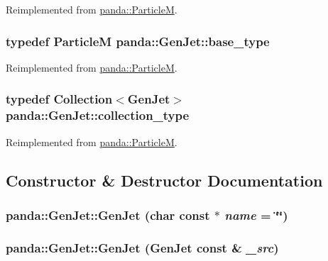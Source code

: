 Reimplemented from \hyperlink{classpanda_1_1ParticleM_a1ba36e35f5cd6a26decfbaa815678d2a}{panda::ParticleM}.\hypertarget{classpanda_1_1GenJet_acec2fc5754d9d9da9805cbdaff566ee4}{
\subsubsection[{base\_\-type}]{\setlength{\rightskip}{0pt plus 5cm}typedef {\bf ParticleM} {\bf panda::GenJet::base\_\-type}}}
\label{classpanda_1_1GenJet_acec2fc5754d9d9da9805cbdaff566ee4}


Reimplemented from \hyperlink{classpanda_1_1ParticleM_a134d640b78531bc47ddb19ba490de07d}{panda::ParticleM}.\hypertarget{classpanda_1_1GenJet_adf2446e9cb42ccd9a7b2e790d674965a}{
\subsubsection[{collection\_\-type}]{\setlength{\rightskip}{0pt plus 5cm}typedef {\bf Collection}$<${\bf GenJet}$>$ {\bf panda::GenJet::collection\_\-type}}}
\label{classpanda_1_1GenJet_adf2446e9cb42ccd9a7b2e790d674965a}


Reimplemented from \hyperlink{classpanda_1_1ParticleM_ae39fbe234c21960d067e8790541d0d68}{panda::ParticleM}.

\subsection{Constructor \& Destructor Documentation}
\hypertarget{classpanda_1_1GenJet_aca195391522e9b5e1541ba22f3dedb6e}{
\subsubsection[{GenJet}]{\setlength{\rightskip}{0pt plus 5cm}panda::GenJet::GenJet (char const $\ast$ {\em name} = {\ttfamily \char`\"{}\char`\"{}})}}
\label{classpanda_1_1GenJet_aca195391522e9b5e1541ba22f3dedb6e}
\hypertarget{classpanda_1_1GenJet_a2061e0c00ed8d4f404e70156120fd9c0}{
\subsubsection[{GenJet}]{\setlength{\rightskip}{0pt plus 5cm}panda::GenJet::GenJet ({\bf GenJet} const \& {\em \_\-src})}}
\label{classpanda_1_1GenJet_a2061e0c00ed8d4f404e70156120fd9c0}


